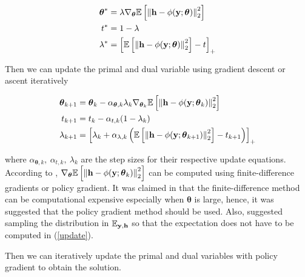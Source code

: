 \documentclass[a4paper, onecolumn, 11pt]{IEEEtran}
\begin{document}
        \begin{align} \label{stationarity}
            \boldsymbol{\theta}^* &= \lambda \nabla_{\boldsymbol{\theta}}
                \mathbb{E}\left[\left\| {\bf h}-\phi(\mathbf{y};\boldsymbol{\theta}) \right\|^2_2 \right]\\
            t^* &= 1-\lambda\\
            \lambda^* &= \left[ \mathbb{E}\left[\left\| {\bf h}-\phi(\mathbf{y};\boldsymbol{\theta}) \right\|^2_2 \right] -t\right]_{+}
        \end{align}
        
        Then we can update the primal and dual variable using gradient descent or ascent iteratively

        \begin{align} \label{update}
            \boldsymbol{\theta}_{k+1} &= \boldsymbol{\theta}_{k} - 
                \alpha_{\boldsymbol{\theta},k} \lambda_k \nabla_{\boldsymbol{\theta}_k}
                \mathbb{E}\left[\left\| {\bf h}-\phi(\mathbf{y};\boldsymbol{\theta}_k) \right\|^2_2 \right]\\
            t_{k+1} &= t_{k} - \alpha_{t,k}(1-\lambda_k)\\
            \lambda_{k+1} &= \left[ \lambda_k + \alpha_{\lambda,k}
                \left( \mathbb{E}\left[\left\| {\bf h}-\phi(\mathbf{y};\boldsymbol{\theta}_{k+1}) \right\|^2_2 \right] 
                -t_{k+1}\right)\right]_{+}
        \end{align}

        where $\alpha_{\boldsymbol{\theta},k},~ \alpha_{t,k},~ \lambda_k$ are the step sizes for their respective update equations.
        According to \cite{Eisen2019journal}, $\nabla_{\boldsymbol{\theta}}\mathbb{E}\left[\left\| {\bf h}-\phi(\mathbf{y};\boldsymbol{\theta}_k) \right\|^2_2 \right]$ 
        can be computed using finite-difference gradients or policy gradient.
        It was claimed in \cite{Eisen2019journal} that the finite-difference method can be
        computational expensive especially when $\boldsymbol{\theta}$ is large, hence, it was suggested that the policy gradient method should be used.
        Also, \cite{Eisen2020} suggested sampling the distribution in $\mathbb{E}_{{\bf y},{\bf h}}$ so that the expectation does not have to be computed in (\ref{update}).

        Then we can iteratively update the primal and dual variables with policy gradient to obtain the solution.
    
\end{document}
